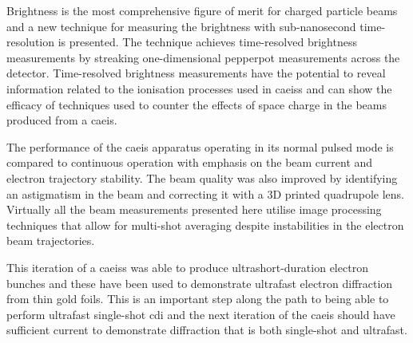 Brightness is the most comprehensive figure of merit for charged particle beams and a new technique for measuring the brightness with sub-nanosecond time-resolution is presented.
The technique achieves time-resolved brightness measurements by streaking one-dimensional pepperpot measurements across the detector.
Time-resolved brightness measurements have the potential to reveal information related to the ionisation processes used in \glspl{caeis} and can show the efficacy of techniques used to counter the effects of space charge in the beams produced from a \gls{caeis}.

The performance of the \gls{caeis} apparatus operating in its normal pulsed mode is compared to continuous operation with emphasis on the beam current and electron trajectory stability.
The beam quality was also improved by identifying an astigmatism in the beam and correcting it with a 3D printed quadrupole lens.
Virtually all the beam measurements presented here utilise image processing techniques that allow for multi-shot averaging despite instabilities in the electron beam trajectories.

This iteration of a \glspl{caeis} was able to produce ultrashort-duration electron bunches and these have been used to demonstrate ultrafast electron diffraction from thin gold foils.
This is an important step along the path to being able to perform ultrafast single-shot \gls{cdi} and the next iteration of the \gls{caeis} should have sufficient current to demonstrate diffraction that is both single-shot and ultrafast.